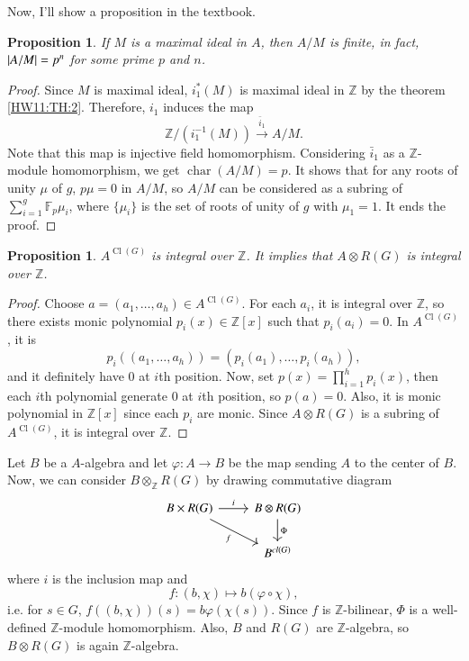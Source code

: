 \documentclass[a4paper, 12pt]{article}
\theoremstyle{Mydefinition}
\theoremstyle{Mytheorem}
\newtheorem{proposition}[statement]{Proposition}
\DeclareMathOperator{\cl}{Cl}
\DeclareMathOperator{\Char}{char}
\begin{document}
Now, I'll show a proposition in the textbook.
\begin{proposition}
If $M$ is a maximal ideal in $A$, then $A/M$ is finite, in fact, $\abs{A/M}=p^n$ for some prime $p$ and $n$.
\end{proposition}
\begin{proof}
Since $M$ is maximal ideal, $i_1^*(M)$ is maximal ideal in $\mathbb{Z}$ by the theorem \ref{HW11:TH:2}. Therefore, $i_1$ induces the map
\begin{equation}
    \mathbb{Z}/(i_1^{-1}(M))\xrightarrow{\bar{i}_1}A/M.
\end{equation}
Note that this map is injective field homomorphism. Considering $\bar{i}_1$ as a $\mathbb{Z}$-module homomorphism, we get $\Char(A/M) = p$. It shows that for any roots of unity $\mu$ of $g$, $p\mu = 0$ in $A/M$, so $A/M$ can be considered as a subring of $\sum_{i=1}^g \mathbb{F}_p\mu_i$, where $\{\mu_i\}$ is the set of roots of unity of $g$ with $\mu_1 = 1$. It ends the proof.
\end{proof}
\begin{proposition}\label{HW11:Prop:1}
$A^{\cl(G)}$ is integral over $\mathbb{Z}$. It implies that $A\otimes R(G)$ is integral over $\mathbb{Z}$.
\end{proposition}
\begin{proof}
Choose $a=(a_1, \ldots, a_h)\in A^{\cl(G)}$. For each $a_i$, it is integral over $\mathbb{Z}$, so there exists monic polynomial $p_i(x)\in\mathbb{Z}[x]$ such that $p_i(a_i) = 0$. In $A^{\cl(G)}$, it is
\begin{equation}
    p_i((a_1, \ldots, a_h)) = (p_i(a_1), \ldots, p_i(a_h)),
\end{equation}
and it definitely have $0$ at $i$th position. Now, set $p(x) = \prod_{i=1}^h p_i(x)$, then each $i$th polynomial generate $0$ at $i$th position, so $p(a)=0$. Also, it is monic polynomial in $\mathbb{Z}[x]$ since each $p_i$ are monic. Since $A\otimes R(G)$ is a subring of $A^{\cl(G)}$, it is integral over $\mathbb{Z}$.
\end{proof}

Let $B$ be a $A$-algebra and let $\varphi:A\rightarrow B$ be the map sending $A$ to the center of $B$. Now, we can consider $B\otimes_{\mathbb{Z}} R(G)$ by drawing commutative diagram
\[
  \begin{tikzcd}
    B\times R(G) \arrow{r}{i} \arrow[swap]{dr}{f} & B\otimes R(G) \arrow{d}{\Phi} \\
     & B^{cl(G)}
  \end{tikzcd}
\]
where $i$ is the inclusion map and
\begin{equation}
    f:(b, \chi) \mapsto b(\varphi\circ \chi),
\end{equation}
i.e. for $s\in G$, $f((b,\chi))(s) = b\varphi(\chi(s))$. Since $f$ is $\mathbb{Z}$-bilinear, $\Phi$ is a well-defined $\mathbb{Z}$-module homomorphism. Also, $B$ and $R(G)$ are $\mathbb{Z}$-algebra, so $B\otimes R(G)$ is again $\mathbb{Z}$-algebra.
\end{document}
